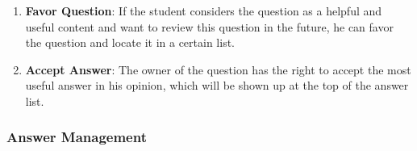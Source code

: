 \begin{enumerate}
\item
\textbf{Favor Question}: If the student considers the question as a helpful and useful content and want to review this question in the future, he can favor the question and locate it in a certain list.


\item
\textbf{Accept Answer}: The owner of the question has the right to accept the most useful answer in his opinion, which will be shown up at the top of the answer list.


\end{enumerate}

\subsubsection{Answer Management}

